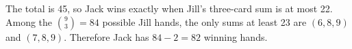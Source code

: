 The total is 45, so Jack wins exactly when Jill's three-card sum is at most 22. Among the $\binom93=84$ possible Jill hands, the only sums at least 23 are $(6,8,9)$ and $(7,8,9)$. Therefore Jack has $84-2=\boxed{82}$ winning hands.
